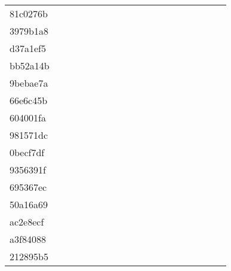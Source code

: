 \begin{table*}[htb]
\begin{tabular}{l|cccccccccccccccccc}
81c0276b  & \C & \X & \X & \X & \X & \X & \X & \X & \X & \X & \C & \C & \C & \C & \C & \X & \X \\
3979b1a8  & \C & \C & \X & \C & \C & \C & \C & \X & \C & \X & \X & \C & \C & \C & \C & \C & \C \\
d37a1ef5  & \C & \X & \X & \C & \X & \C & \X & \X & \X & \X & \X & \X & \X & \C & \C & \C & \C \\
bb52a14b  & \C & \X & \X & \X & \X & \X & \X & \X & \X & \X & \X & \X & \X & \C & \C & \X & \X \\
9bebae7a  & \C & \X & \X & \X & \X & \X & \X & \X & \X & \X & \X & \X & \X & \C & \C & \X & \X \\
66e6c45b  & \C & \C & \C & \C & \C & \C & \C & \C & \C & \C & \C & \C & \C & \C & \C & \C & \C \\
604001fa  & \C & \X & \X & \X & \X & \X & \X & \X & \X & \X & \X & \X & \X & \C & \C & \X & \X \\
981571dc  & \C & \X & \X & \X & \X & \X & \X & \X & \X & \X & \X & \X & \X & \X & \C & \C & \X \\
0becf7df  & \C & \X & \X & \X & \X & \C & \C & \C & \C & \X & \X & \X & \C & \C & \C & \X & \C \\
9356391f  & \C & \X & \X & \X & \X & \X & \X & \X & \X & \X & \X & \X & \X & \C & \C & \X & \X \\
695367ec  & \C & \X & \C & \X & \C & \X & \X & \C & \C & \X & \C & \C & \C & \C & \C & \X & \C \\
50a16a69  & \C & \C & \X & \X & \X & \C & \C & \C & \X & \C & \X & \C & \C & \C & \C & \C & \C \\
ac2e8ecf  & \C & \X & \X & \X & \X & \X & \X & \X & \X & \X & \X & \X & \X & \C & \C & \X & \X \\
a3f84088  & \C & \C & \X & \X & \X & \C & \C & \X & \X & \X & \X & \X & \X & \X & \X & \C & \C \\
212895b5  & \X & \X & \X & \X & \X & \X & \X & \X & \X & \X & \X & \X & \X & \X & \X & \X & \X \\
\bottomrule
\end{tabular}
\label{tab:arc400eval3}
\end{table*}


\newpage
\clearpage

